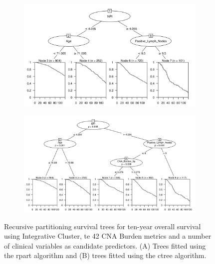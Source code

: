 \begin{figure}[!htb]
\centering

\vspace{1cm}

\begin{subfigure}{\textwidth}
\subcaption{}
\includegraphics[width=1\textwidth]{../figures/Appendices/Appendix_B/Clin_PA_PartyKit_Survival_Burden_TenYearOS_INTCLUST.png}
\end{subfigure}

\vspace{2cm}

\begin{subfigure}{\textwidth}
\subcaption{}
\includegraphics[width=1\textwidth]{../figures/Appendices/Appendix_B/Clin_PA_Ctree_Survival_Burden_TenYearOS_INTCLUST.png}
\end{subfigure}

\vspace{1cm}

\caption[Recursive partitioning survival trees for ten-year overall survival using Integrative Cluster, the 42 CNA Burden metrics and a number of clinical variables as candidate predictors.]{Recursive partitioning survival trees for ten-year overall survival using Integrative Cluster, te 42 CNA Burden metrics and a number of clinical variables as candidate predictors. (A) Trees fitted using the rpart algorithm and (B) trees fitted using the ctree algorithm.}
\end{figure}
\FloatBarrier


